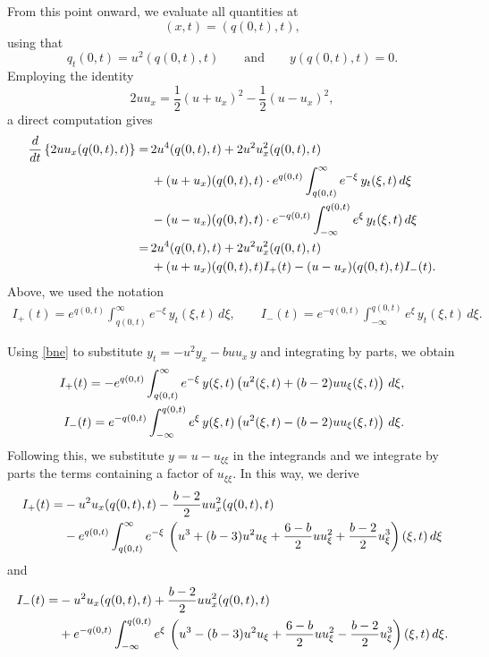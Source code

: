 \documentclass{amsart}
\begin{document}
From this point onward, we evaluate all quantities at
\begin{equation*}
(x,t)=(q(0,t), t),
\end{equation*}
using that
\begin{equation*}
q_t(0,t)=u^2(q(0,t), t)\qquad\text{and}\qquad y(q(0,t),t)= 0.
\end{equation*}
Employing the identity
\begin{equation*}
2 u u_x =  \frac{1}{2}(u + u_x)^2 -  \frac{1}{2}(u - u_x)^2,
\end{equation*}
a direct computation gives
\begin{equation}
\aligned
\frac{d}{dt}\left\{2 u u_x(q(0,t), t)\right\}=\,&2u^4(q(0,t), t)+2u^2u_x^2(q(0,t), t)\\&+ (u + u_x)(q(0,t), t) \cdot e^{q(0,t)} \int_{q(0,t)}^\infty e^{-\xi} \,y_t (\xi,t)\, d\xi\\&- (u - u_x)(q(0,t), t) \cdot e^{-q(0,t)} \int_{-\infty}^{q(0,t)} e^\xi\, y_t (\xi, t)\, d\xi\\
=\,&2u^4(q(0,t), t)+2u^2u_x^2(q(0,t), t)\\&+(u + u_x)(q(0,t), t) I_+(t)-(u - u_x)(q(0,t), t) I_-(t). 
\endaligned
\label{uxt}
\end{equation}
Above, we used the notation
\begin{align*}
I_+(t)=e^{q(0,t)} \int_{q(0,t)}^\infty e^{-\xi} \,y_t (\xi,t)\, d\xi,\qquad
I_-(t)=e^{-q(0,t)} \int_{-\infty}^{q(0,t)} e^\xi \,y_t (\xi, t)\, d\xi. 
\end{align*}

Using \eqref{bne} to substitute $y_t=-u^2y_x-buu_x\,y$ and integrating by parts, we obtain
\begin{equation*}
\aligned
I_+(t)=-e^{q(0,t)} \int_{q(0,t)}^\infty e^{-\xi} \,y(\xi,t)\left(u^2(\xi,t)+(b-2)uu_\xi(\xi,t)\right)\, d\xi,\\
I_-(t)=e^{-q(0,t)} \int_{-\infty}^{q(0,t)} e^\xi \,y(\xi, t)\left(u^2(\xi,t)-(b-2)uu_\xi(\xi,t)\right)\, d\xi. 
\endaligned
\end{equation*}
Following this, we substitute $y=u-u_{\xi\xi}$ in the integrands and we integrate by parts the terms containing a factor of $u_{\xi\xi}$. In this way, we derive
\begin{equation}\aligned
I_+(t)=&-u^2u_x(q(0,t), t)-\frac{b-2}{2}uu^2_x(q(0,t), t)\\
&-e^{q(0,t)} \int_{q(0,t)}^\infty e^{-\xi} \,\left(u^3+(b-3)u^2u_\xi+\frac{6-b}{2}uu_\xi^2+\frac{b-2}{2}u_\xi^3\right)(\xi,t)\,d\xi
\endaligned
\label{i+}
\end{equation}
and
\begin{equation}\aligned
I_-(t)=&-u^2u_x(q(0,t), t)+\frac{b-2}{2}uu^2_x(q(0,t), t)\\
&+e^{-q(0,t)} \int^{q(0,t)}_{-\infty} e^{\xi} \,\left(u^3-(b-3)u^2u_\xi+\frac{6-b}{2}uu_\xi^2-\frac{b-2}{2}u_\xi^3\right)(\xi,t)\,d\xi.
\endaligned
\label{i-}
\end{equation}
\end{document}
